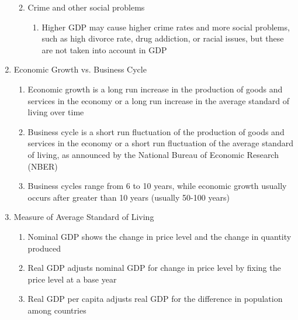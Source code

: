 \documentclass[12pt]{article}
\begin{document}
\begin{enumerate}
\begin{enumerate}
\begin{enumerate}
            \end{enumerate}

          \item Crime and other social problems

            \begin{enumerate}

              \item Higher GDP may cause higher crime rates and more social problems, such as high divorce rate, drug addiction, or racial issues, but these are not taken into account in GDP

            \end{enumerate}

        \end{enumerate}

      \item Economic Growth vs. Business Cycle

        \begin{enumerate}

          \item Economic growth is a long run increase in the production of goods and services in the economy or a long run increase in the average standard of living over time

          \item Business cycle is a short run fluctuation of the production of goods and services in the economy or a short run fluctuation of the average standard of living, as announced by the National Bureau of Economic Research (NBER)

          \item Business cycles range from 6 to 10 years, while economic growth usually occurs after greater than 10 years (usually 50-100 years)

        \end{enumerate}

      \item Measure of Average Standard of Living

        \begin{enumerate}

          \item Nominal GDP shows the change in price level and the change in quantity produced

          \item Real GDP adjusts nominal GDP for change in price level by fixing the price level at a base year

          \item Real GDP per capita adjusts real GDP for the difference in population among countries


\end{enumerate}
\end{enumerate}
\end{document}
